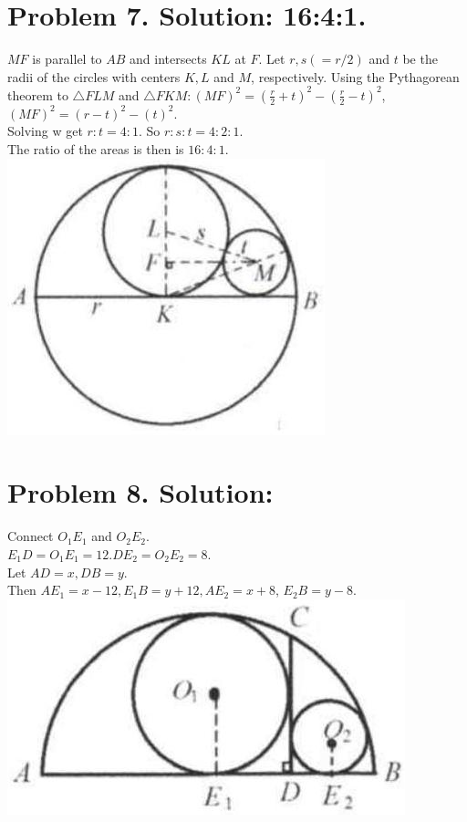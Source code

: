 \documentclass[10pt]{article}
\begin{document}
\section*{Problem 7. Solution: 16:4:1.}
\(M F\) is parallel to \(A B\) and intersects \(K L\) at \(F\). Let \(r, s(=r / 2)\) and \(t\) be the radii of the circles with centers \(K, L\) and \(M\), respectively. Using the Pythagorean theorem to \(\triangle F L M\) and \(\triangle F K M:(M F)^{2}=\left(\frac{r}{2}+t\right)^{2}-\left(\frac{r}{2}-t\right)^{2}\), \((M F)^{2}=(r-t)^{2}-(t)^{2}\).\\
Solving w get \(r: t=4: 1\). So \(r: s: t=4: 2: 1\).\\
The ratio of the areas is then is \(16: 4: 1\).\\
\includegraphics[max width=\textwidth, center]{2025_04_17_97bc1f7e44d93c271a88g-189}

\section*{Problem 8. Solution:}
Connect \(O_{1} E_{1}\) and \(O_{2} E_{2}\).\\
\(E_{1} D=O_{1} E_{1}=12 . D E_{2}=O_{2} E_{2}=8\).\\
Let \(A D=x, D B=y\).\\
Then \(A E_{1}=x-12, E_{1} B=y+12, A E_{2}=x+8\), \(E_{2} B=y-8\).\\
\includegraphics[max width=\textwidth, center]{2025_04_17_97bc1f7e44d93c271a88g-189(1)}
\end{document}
